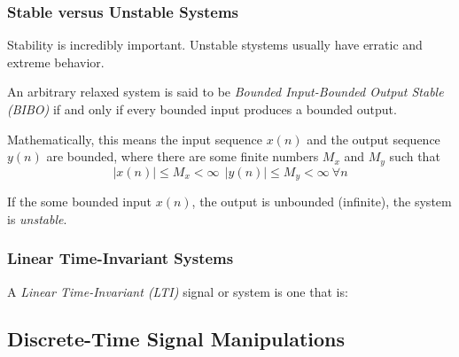 \subsubsection{Stable versus Unstable Systems}\label{subsubsec:Stable_vs_Unstable_Systems}
Stability is incredibly important.
Unstable stystems usually have erratic and extreme behavior.

\begin{definition}[Stable]\label{def:Stable}
  An arbitrary relaxed system is said to be \emph{Bounded Input-Bounded Output Stable (BIBO)} if and only if every bounded input produces a bounded output.

  Mathematically, this means the input sequence $x(n)$ and the output sequence $y(n)$ are bounded, where there are some finite numbers $M_{x}$ and $M_{y}$ such that
  \begin{equation}\label{eq:Stable}
    \lvert x(n) \rvert \leq M_{x} < \infty \:\: \lvert y(n) \rvert \leq M_{y} < \infty \: \forall n
  \end{equation}
\end{definition}

\begin{definition}[Unstable]
  If the some bounded input $x(n)$, the output is unbounded (infinite), the system is \emph{unstable}.
\end{definition}

\subsubsection{Linear Time-Invariant Systems}\label{subsubsec:Linear_Time-Invariant}
\begin{definition}\label{def:Linear_Time-Invariant}
  A \emph{Linear Time-Invariant (LTI)} signal or system is one that is:
  \begin{propertylist}
  \item {}
  \item {}
  \end{propertylist}
\end{definition}

\subsection{Discrete-Time Signal Manipulations}\label{subsec:Discrete-Time Signal Manipulations}
